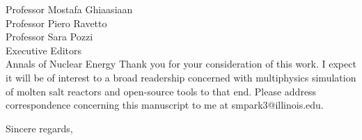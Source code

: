 \documentclass[11pt]{letter} %
\begin{document}
\begin{letter}{Professor Mostafa Ghiaasiaan\\
Professor Piero Ravetto\\
Professor Sara Pozzi\\
Executive Editors\\
Annals of Nuclear Energy}
Thank you for your consideration of this work. I expect it will be of interest
to a broad readership concerned with multiphysics simulation of molten salt
reactors and open-source tools to that end. Please address correspondence
concerning this manuscript to me at \mbox{smpark3@illinois.edu}.

\closing{\hspace{3cm} Sincere regards,}


\end{letter}
\end{document}
